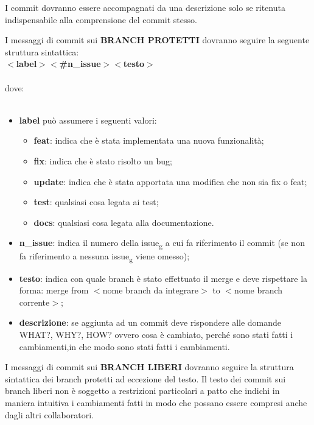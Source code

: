 I commit dovranno essere accompagnati da una descrizione solo se ritenuta indispensabile alla comprensione del commit stesso.

I messaggi di commit sui \textbf{\uppercase{branch protetti}} dovranno seguire la seguente struttura sintattica:\\

\textbf{$<$label$>$$<$\#n\_issue$>$$<$testo$>$}\\\\
dove:\\\\
\begin{itemize}
\item \textbf{label} può assumere i seguenti valori:
	\begin{itemize}
	\item \textbf{feat}: indica che è stata implementata una nuova funzionalità;
	\item \textbf{fix}: indica che è stato risolto un bug;
	\item \textbf{update}: indica che è stata apportata una modifica che non sia fix o feat;
	\item \textbf{test}: qualsiasi cosa legata ai test;
	\item \textbf{docs}: qualsiasi cosa legata alla documentazione.
	\end{itemize}
\item \textbf{n\_issue}: indica il numero della issue\textsubscript{g} a cui fa riferimento il commit (se non fa riferimento a nessuna issue\textsubscript{g} viene omesso);
\item \textbf{testo}: indica con quale branch è stato effettuato il merge e deve rispettare la forma: merge from $<$nome branch da integrare$>$ to $<$nome branch corrente$>$;
\item \textbf{descrizione}: se aggiunta ad un commit deve rispondere alle domande WHAT?, WHY?, HOW? ovvero
cosa è cambiato, perché sono stati fatti i cambiamenti,in che modo sono stati fatti i cambiamenti.\\
\end{itemize}
I messaggi di commit sui \textbf{\uppercase{branch liberi}} dovranno seguire la struttura sintattica dei branch protetti ad eccezione del testo.
Il testo dei commit sui branch liberi non è soggetto a restrizioni particolari a patto che indichi in maniera intuitiva i cambiamenti fatti
in modo che possano essere compresi anche dagli altri collaboratori.



